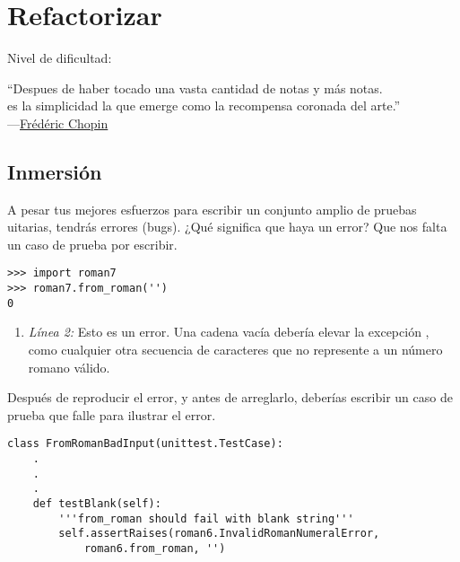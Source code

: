 
\chapter{Refactorizar}\label{ch:refactorizar}

\noindent
Nivel de dificultad:\difllll

\begin{citaCap}
``Despues de haber tocado una vasta cantidad de notas y más notas. \\
es la simplicidad la que emerge como la recompensa coronada del arte.'' \\
---\href{http://en.wikiquote.org/wiki/Frédéric\_Chopin}{Frédéric Chopin}
\end{citaCap}

\section{Inmersión}

A pesar tus mejores esfuerzos para escribir un conjunto amplio de pruebas uitarias, tendrás errores (bugs). ¿Qué significa que haya un error? Que nos falta un caso de prueba por escribir.

\noindent\begin{minipage}{\textwidth}
\begin{lstlisting}[mathescape=True]
>>> import roman7
>>> roman7.from_roman('')
0
\end{lstlisting}
\end{minipage}

\begin{enumerate}

\item \emph{Línea 2:} Esto es un error. Una cadena vacía debería elevar la excepción , como cualquier otra secuencia de caracteres que no represente a un número romano válido.

\end{enumerate}

Después de reproducir el error, y antes de arreglarlo, deberías escribir un caso de prueba que falle para ilustrar el error.

\noindent\begin{minipage}{\textwidth}
\begin{lstlisting}[mathescape=True]
class FromRomanBadInput(unittest.TestCase):  
    .
    .
    .
    def testBlank(self):
        '''from_roman should fail with blank string'''
        self.assertRaises(roman6.InvalidRomanNumeralError, 
            roman6.from_roman, '') 
\end{lstlisting}
\end{minipage}

